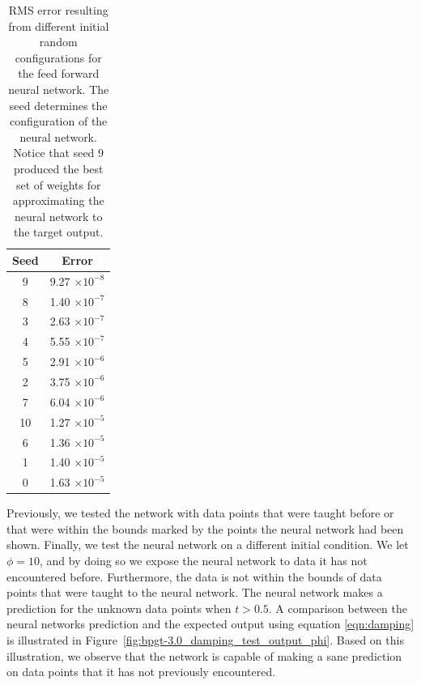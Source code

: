 \documentclass[11pt]{article}
\begin{document}
\begin{table}
	\begin{center}
		\begin{tabular}{|c|c|}
		\hline
		Seed & Error\\
		\hline
		9 & 9.27 $\times 10^{-8}$\\
		8 & 1.40 $\times 10^{-7}$\\
		3 & 2.63 $\times 10^{-7}$\\
		4 & 5.55 $\times 10^{-7}$\\
		5 & 2.91 $\times 10^{-6}$\\
		2 & 3.75 $\times 10^{-6}$\\
		7 & 6.04 $\times 10^{-6}$\\
		10 & 1.27 $\times 10^{-5}$\\
		6 & 1.36 $\times 10^{-5}$\\
		1 & 1.40 $\times 10^{-5}$\\
		0 & 1.63 $\times 10^{-5}$\\
		\hline
		\end{tabular}
	\end{center}
	\caption{RMS error resulting from different initial random configurations for the feed forward neural network. The seed determines the configuration of the neural network. Notice that seed $9$ produced the best set of weights for approximating the neural network to the target output.}
	\label{tab:training_seeds}
\end{table}

Previously, we tested the network with data points that were taught before or that were within the bounds marked by the points the
neural network had been shown. Finally, we test the neural network on a different initial condition. We let $\phi=10$, and by doing so
we expose the neural network to data it has not encountered before. Furthermore, the data is not within the bounds of data points that
were taught to the neural network. The neural network makes a prediction for the unknown data points when $t > 0.5$. A comparison
between the neural networks prediction and the expected output using equation \ref{eqn:damping} is illustrated in
Figure~\ref{fig:bpgt-3.0_damping_test_output_phi}. Based on this illustration, we observe that the network is capable of making a sane
prediction on data points that it has not previously encountered.
\end{document}
